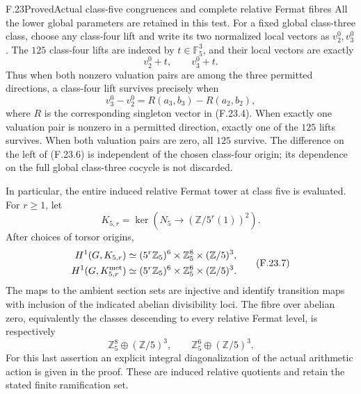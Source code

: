 \begin{statement}{F.23}{Proved}{Actual class-five congruences and complete relative Fermat fibres}
All the lower global parameters are retained in this test.
For a fixed global class-three class, choose any class-four
lift and write its two normalized local vectors as
\(v_2^0,v_3^0\). The \(125\) class-four lifts are indexed by
\(t\in\mathbb F_5^3\), and their local vectors are exactly
\[
                       v_2^0+t,\qquad v_3^0+t.                \tag{F.23.5}
\]
Thus when both nonzero valuation pairs are among the three
permitted directions, a class-four lift survives precisely
when
\[
 v_3^0-v_2^0=R(a_3,b_3)-R(a_2,b_2),                          \tag{F.23.6}
\]
where \(R\) is the corresponding singleton vector in
(F.23.4). When exactly one valuation pair is nonzero in a
permitted direction, exactly one of the \(125\) lifts
survives. When both valuation pairs are zero, all \(125\)
survive. The difference on the left of (F.23.6) is independent
of the chosen class-four origin; its dependence on the full
global class-three cocycle is not discarded.

In particular, the entire induced relative Fermat tower at
class five is evaluated. For \(r\geq1\), let
\[
 K_{5,r}=\ker\!\left(N_5\longrightarrow
                              (\mathbb Z/5^r(1))^2\right).
\]
After choices of torsor origins,
\[
\begin{aligned}
 H^1(G,K_{5,r})&\simeq
        (5^r\mathbb Z_5)^6\times\mathbb Z_5^8
                                      \times(\mathbb Z/5)^3,\\
 H^1(G,K_{5,r}^{\rm met})&\simeq
        (5^r\mathbb Z_5)^6\times\mathbb Z_5^6
                                      \times(\mathbb Z/5)^3.
\end{aligned}                                                   \tag{F.23.7}
\]
The maps to the ambient section sets are injective and
identify transition maps with inclusion of the indicated
abelian divisibility loci. The fibre over abelian zero,
equivalently the classes descending to every relative
Fermat level, is respectively
\[
 \mathbb Z_5^8\oplus(\mathbb Z/5)^3,\qquad
 \mathbb Z_5^6\oplus(\mathbb Z/5)^3.                           \tag{F.23.8}
\]
For this last assertion an explicit integral diagonalization
of the actual arithmetic action is given in the proof.
These are induced relative quotients and retain the stated
finite ramification set.
\end{statement}

